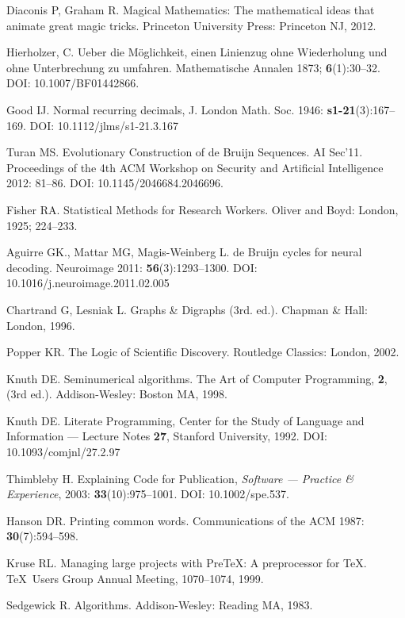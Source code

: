 \documentclass[12pt]{article}
\begin{document}
{\begin{thebibliography}{00}
Diaconis P, Graham R. Magical Mathematics: The mathematical ideas that animate great magic tricks. Princeton University Press: Princeton NJ, 2012.


Hierholzer, C. Ueber die M\"oglichkeit, einen Linienzug ohne Wiederholung und ohne Unterbrechung zu umfahren. Mathematische Annalen 1873; \textbf{6}(1):30--32. DOI: 10.1007/BF01442866.


Good IJ. Normal recurring decimals, J. London Math. Soc. 1946: \textbf{s1-21}(3):167--169. DOI: 10.1112/jlms/s1-21.3.167

Turan MS. Evolutionary Construction of de Bruijn Sequences. AI Sec'11. Proceedings of the 4th ACM Workshop on Security and Artificial Intelligence 2012: 81--86. DOI: 10.1145/2046684.2046696.

Fisher RA. Statistical Methods for Research Workers. Oliver and Boyd: London, 1925; 224--233.

Aguirre GK., Mattar MG, Magis-Weinberg L. de Bruijn cycles for neural decoding. Neuroimage 2011: \textbf{56}(3):1293--1300. DOI: 10.1016/j.neuroimage.2011.02.005


Chartrand G, Lesniak L. Graphs \& Digraphs (3rd. ed.). Chapman \& Hall: London, 1996.

Popper KR. The Logic of Scientific Discovery. Routledge Classics: London, 2002.

Knuth DE. Seminumerical algorithms. The Art of Computer Programming, \textbf{2}, (3rd ed.). Addison-Wesley: Boston MA, 1998.

Knuth DE. Literate Programming, Center for the Study of Language and Information --- Lecture Notes \textbf{27}, Stanford University, 1992. DOI: 10.1093/comjnl/27.2.97

Thimbleby H. Explaining Code for Publication, \emph{Software --- Practice {\&} Experience}, 2003: \textbf{33}(10):975--1001. DOI: 10.1002/spe.537.

Hanson DR. Printing common words. Communications of the ACM 1987: \textbf{30}(7):594--598.

Kruse RL. Managing large projects with Pre\TeX: A preprocessor for \TeX. \TeX\ Users Group Annual Meeting, 1070--1074, 1999.

Sedgewick R. Algorithms. Addison-Wesley: Reading MA, 1983.

\end{thebibliography}}
\end{document}
